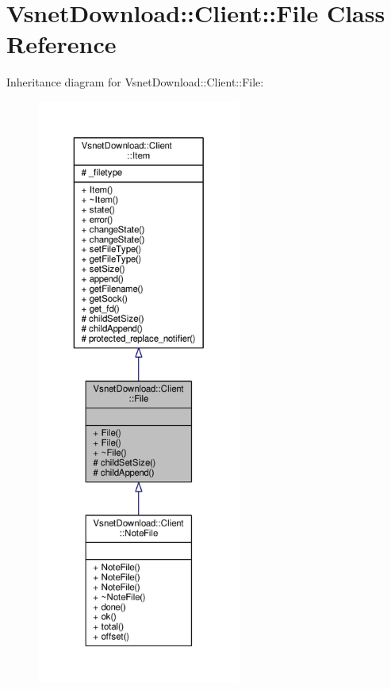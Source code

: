 \hypertarget{classVsnetDownload_1_1Client_1_1File}{}\section{Vsnet\+Download\+:\+:Client\+:\+:File Class Reference}
\label{classVsnetDownload_1_1Client_1_1File}


Inheritance diagram for Vsnet\+Download\+:\+:Client\+:\+:File\+:
\nopagebreak
\begin{figure}[H]
\begin{center}
\leavevmode
\includegraphics[height=550pt]{d7/d6b/classVsnetDownload_1_1Client_1_1File__inherit__graph}
\end{center}
\end{figure}



